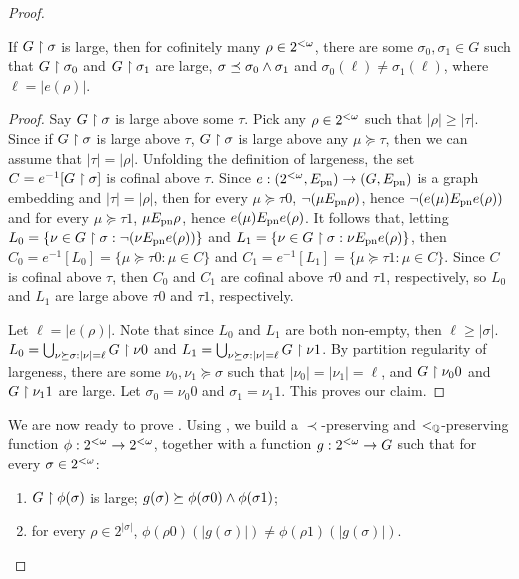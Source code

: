 \begin{proof}
\begin{claim}\label{claim:blossom-to-joyce-rado-combi}
If $G \upharpoonright \sigma$ is large, then for cofinitely many $\rho \in {2^{<\omega}}$, there are some $\sigma_0, \sigma_1 \in G$ such that
$G \upharpoonright \sigma_0$ and $G \upharpoonright \sigma_1$ are large, $\sigma \preceq \sigma_0 \wedge \sigma_1$ and $\sigma_0(\ell) \neq \sigma_1(\ell)$, where $\ell = |e(\rho)|$.
\end{claim}
\begin{proof}
Say $G \upharpoonright \sigma$ is large above some $\tau$. Pick any $\rho \in {2^{<\omega}}$ such that $|\rho| \geq |\tau|$. Since if $G \upharpoonright \sigma$ is large above $\tau$, $G \upharpoonright \sigma$ is large above any $\mu \succeq \tau$, then we can assume that $|\tau| = |\rho|$. Unfolding the definition of largeness,
the set $C = e^{-1}[G \upharpoonright \sigma]$ is cofinal above $\tau$. Since $e: ({2^{<\omega}}, E_{\mathrm{pn}}) \to (G, E_{\mathrm{pn}})$ is a graph embedding and $|\tau| = |\rho|$,
then for every $\mu \succeq \tau 0$, $\neg(\mu E_{\mathrm{pn}} \rho)$, hence $\neg(e(\mu) E_{\mathrm{pn}} e(\rho))$ and for every $\mu \succeq \tau 1$, $\mu E_{\mathrm{pn}} \rho$, hence $e(\mu) E_{\mathrm{pn}} e(\rho)$. It follows that, letting $L_0 = \{\nu \in G \upharpoonright \sigma: \neg(\nu E_{\mathrm{pn}} e(\rho))\}$ and $L_1 = \{\nu \in G \upharpoonright \sigma: \nu E_{\mathrm{pn}} e(\rho)\}$, then  $C_0 = e^{-1}[L_0] = \{ \mu \succeq \tau 0: \mu \in C \}$ and $C_1 = e^{-1}[L_1] = \{ \mu \succeq \tau 1: \mu \in C \}$. Since $C$ is cofinal above $\tau$, then $C_0$ and $C_1$ are cofinal above $\tau 0$ and $\tau 1$, respectively, so $L_0$ and $L_1$ are large above $\tau 0$ and $\tau 1$, respectively.

Let $\ell = |e(\rho)|$. Note that since $L_0$ and $L_1$ are both non-empty, then $\ell \geq |\sigma|$.  $L_0 = \bigcup_{\nu \succeq \sigma: |\nu| = \ell} G \upharpoonright \nu 0$
and $L_1 = \bigcup_{\nu \succeq \sigma: |\nu| = \ell} G \upharpoonright \nu 1$.
By partition regularity of largeness, there are some $\nu_0, \nu_1 \succeq \sigma$
such that $|\nu_0| = |\nu_1| = \ell$, and $G \upharpoonright \nu_0 0$  and $G \upharpoonright \nu_1 1$ are large. Let $\sigma_0 = \nu_0 0$ and $\sigma_1 = \nu_1 1$. This proves our claim.
\end{proof}

We are now ready to prove .
Using , we build a $\prec$-preserving and $<_{\mathbb{Q}}$-preserving function $\phi: {2^{<\omega}} \to {2^{<\omega}}$, together with a function $g: {2^{<\omega}} \to G$ such that for every $\sigma \in {2^{<\omega}}$:
\begin{enumerate}
	\item $G \upharpoonright \phi(\sigma)$ is large; $g(\sigma) \succeq \phi(\sigma 0) \wedge \phi(\sigma 1) $;
	\item for every $\rho \in 2^{|\sigma|}$, $\phi(\rho 0)(|g(\sigma)|) \neq \phi(\rho 1)(|g(\sigma)|)$.
\end{enumerate}


\end{proof}
